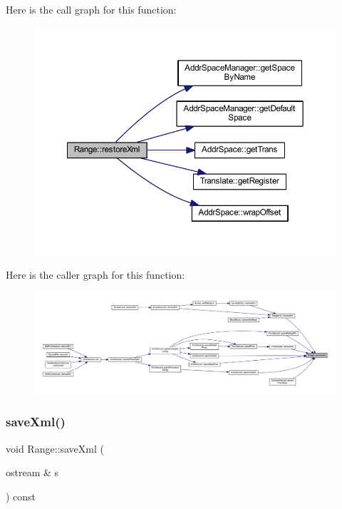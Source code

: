 Here is the call graph for this function\+:
\nopagebreak
\begin{figure}[H]
\begin{center}
\leavevmode
\includegraphics[width=350pt]{class_range_ad88a42471281f5bc6abf1dc1fb79f12b_cgraph}
\end{center}
\end{figure}
Here is the caller graph for this function\+:
\nopagebreak
\begin{figure}[H]
\begin{center}
\leavevmode
\includegraphics[width=350pt]{class_range_ad88a42471281f5bc6abf1dc1fb79f12b_icgraph}
\end{center}
\end{figure}
\mbox{\label{class_range_a81bddd68f2b25699cba18e279d67e75c}} 
\subsubsection{\texorpdfstring{saveXml()}{saveXml()}}
{\footnotesize\ttfamily void Range\+::save\+Xml (\begin{DoxyParamCaption}\item[{ostream \&}]{s }\end{DoxyParamCaption}) const}



